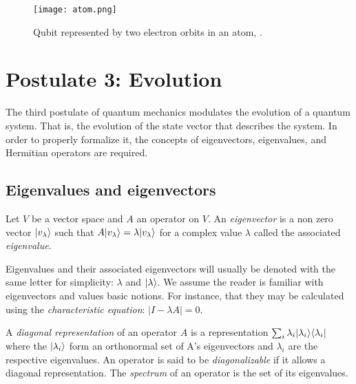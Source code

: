 \begin{figure}[h]
	\texttt{[image: atom.png]}
	\centering
	\caption{Qubit represented by two electron orbits in an atom, \cite{Nielsen2002}.}
	\label{fig 1.1}
\end{figure}


\section{Postulate 3: Evolution}
\label{sec:postulate-3}

The third postulate of quantum mechanics modulates the evolution of a quantum system. That is, the evolution of the state vector that describes the system. In order to properly formalize it, the concepts of eigenvectors, eigenvalues, and Hermitian operators are required.


\subsection{Eigenvalues and eigenvectors}


\begin{definition}
	Let $V$ be a vector space and $A$ an operator on $V$. An \emph{eigenvector} is a non zero vector $|v_\lambda\rangle$ such that $A|v_\lambda\rangle = \lambda|v_\lambda\rangle$ for a complex value $\lambda$ called the associated \emph{eigenvalue}.
\end{definition}

Eigenvalues and their associated eigenvectors will usually be denoted with the same letter for simplicity: $\lambda$ and $|\lambda\rangle$. We assume the reader is familiar with eigenvectors and values basic notions. For instance, that they may be calculated using the \emph{characteristic equation}: $|I - \lambda A| = 0$.

\begin{definition}
	A \emph{diagonal representation} of an operator $A$ is a representation $\sum_i \lambda_i |\lambda_i\rangle\langle\lambda_i|$ where the $|\lambda_i\rangle$ form an orthonormal set of A's eigenvectors and $\lambda_i$ are the respective eigenvalues. An operator is said to be \emph{diagonalizable} if it allows a diagonal representation. The \emph{spectrum} of an operator is the set of its eigenvalues.
\end{definition}

